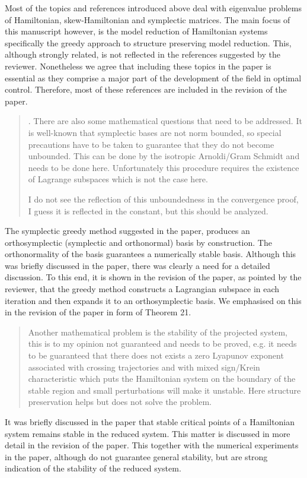 \documentclass[a4paper]{article}
\newcommand{\breview}{\begin{quotation}\begin{bf}\noindent}
\newcommand{\ereview}{\end{bf}\end{quotation}}
\begin{document}
Most of the topics and references introduced above deal with eigenvalue problems of Hamiltonian, skew-Hamiltonian and symplectic matrices. The main focus of this manuscript however, is the model reduction of Hamiltonian systems specifically the greedy approach to structure preserving model reduction. This, although strongly related, is not reflected in the references suggested by the reviewer. Nonetheless we agree that including these topics in the paper is essential as they comprise a major part of the development of the field in optimal control. Therefore, most of these references are included in the revision of the paper.

\breview
2. There are also some mathematical questions that need to be addressed. It is well-known that symplectic bases are not norm bounded, so special precautions have to be taken to guarantee that they do not become unbounded. This can be done by the isotropic Arnoldi/Gram Schmidt and needs to be done here. Unfortunately this procedure requires the existence of Lagrange subspaces which is not the case here.

I do not see the reflection of this unboundedness in the convergence proof, I guess it is reflected in the constant, but this should be analyzed. 
\ereview
The symplectic greedy method suggested in the paper, produces an orthosymplectic (symplectic and orthonormal) basis by construction. The orthonormality of the basis guarantees a numerically stable basis. Although this was briefly discussed in the paper, there was clearly a need for a detailed discussion. To this end, it is shown in the revision of the paper, as pointed by the reviewer, that the greedy method constructs a Lagrangian subspace in each iteration and then expands it to an orthosymplectic basis. We emphasised on this in the revision of the paper in form of Theorem 21.

\breview
Another mathematical problem is the stability of the projected system, this is to my opinion not guaranteed and needs to be proved, e.g. it needs to be guaranteed that there does not exists a zero Lyapunov exponent associated with crossing trajectories and with mixed sign/Krein characteristic which puts the Hamiltonian system on the boundary of the stable region and small perturbations will make it unstable. Here structure preservation helps but does not solve the problem.
\ereview

It was briefly discussed in the paper that stable critical points of a Hamiltonian system remains stable in the reduced system. This matter is discussed in more detail in the revision of the paper. This together with the numerical experiments in the paper, although do not guarantee general stability, but are strong indication of the stability of the reduced system.
\end{document}
